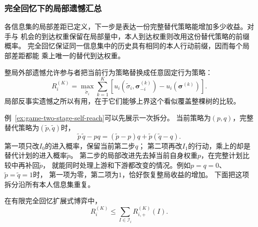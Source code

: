 \subsubsection{完全回忆下的局部遗憾汇总}
\label{sec:game-perfect-recall-regret}

各信息集的局部差距已定义，下一步是表达一份完整替代策略能增加多少收益。对手与
机会的到达权重保留在局部量中，本人到达权重则改用这份替代策略的前缀概率。
完全回忆保证同一信息集中的历史具有相同的本人行动前缀，因而每个局部差距都能
乘上唯一的替代到达权重。

整局外部遗憾允许参与者把当前行为策略替换成任意固定行为策略：
\begin{equation}
  R_i^{(K)}
  =
  \max_{\widetilde{\sigma}_i}
  \sum_{k=1}^{K}
  \left[
    u_i(\widetilde{\sigma}_i,\bm{\sigma}_{-i}^{(k)})
    -
    u_i(\bm{\sigma}^{(k)})
  \right].
  \label{eq:game-extensive-external-regret}
\end{equation}
局部反事实遗憾之所以有用，在于它们能够上界这个看似覆盖整棵树的比较。

例~\ref{ex:game-two-stage-self-reach}可以先展示一次拆分。
当前策略为$(p,q)$，完整替代策略为$(\widetilde p,\widetilde q)$时，
\begin{equation}
 \widetilde p\,\widetilde q-pq
 =(\widetilde p-p)q+\widetilde p(\widetilde q-q).
 \label{eq:game-two-stage-deviation}
\end{equation}
第一项只改$I_0$的进入概率，保留当前第二步$q$；
第二项再改$I_1$的行动，乘上的却是替代计划的进入概率$\widetilde p$。
第二步的局部改进先去掉当前自身权重$p$，在完整计划比较中再补回$\widetilde p$，
就能同时处理上游和下游都改变的情况。例如$p=q=0$、$\widetilde p=\widetilde q=1$时，
第一项为零，第二项为$1$，恰好恢复整局收益的增加。
下面把这项拆分沿所有本人信息集重复。

\begin{theorem}[CFR的反事实遗憾分解]
\label{thm:game-cfr-decomposition}
在有限完全回忆扩展式博弈中，
\begin{equation}
  R_i^{(K)}
  \leq
  \sum_{I\in\mathcal{I}_i}
  R_{i,+}^{(K)}(I).
  \label{eq:game-cfr-global-bound}
\end{equation}
\end{theorem}

